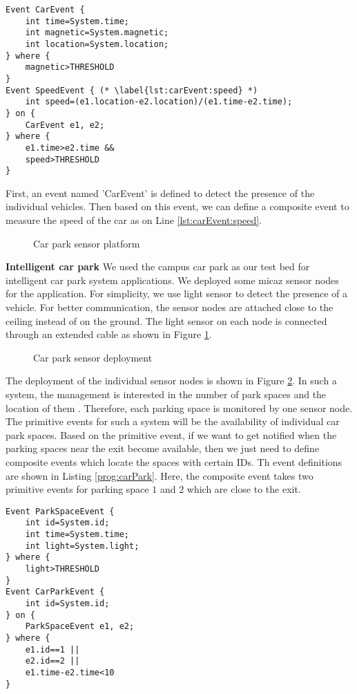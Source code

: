 \begin{lstlisting}[caption=Event definition for tracking vehicles, label=lst:carEvent]
Event CarEvent {
	int time=System.time;
	int magnetic=System.magnetic;
	int location=System.location;
} where {
	magnetic>THRESHOLD
}
Event SpeedEvent { (* \label{lst:carEvent:speed} *)
	int speed=(e1.location-e2.location)/(e1.time-e2.time);
} on {
	CarEvent e1, e2;
} where {
	e1.time>e2.time &&
	speed>THRESHOLD
}
\end{lstlisting}

First, an event named 'CarEvent' is defined to detect the presence of the individual vehicles. Then based on this event, we can define a composite event to measure the speed of the car as on Line \ref{lst:carEvent:speed}.

\begin{figure}
\centering
{}
\caption{Car park sensor platform}
\label{fig:carParkSensor}
\end{figure}

\textbf{Intelligent car park} We used the campus car park as our test bed for intelligent car park system applications. We deployed some micaz sensor nodes for the application. For simplicity, we use light sensor to detect the presence of a vehicle. For better communication, the sensor nodes are attached close to the ceiling instead of on the ground. The light sensor on each node is connected through an extended cable as shown in Figure \ref{fig:carParkSensor}. 

\begin{figure}
\centering
{}
\caption{Car park sensor deployment}
\label{fig:carParkDeployment}
\end{figure}

The deployment of the individual sensor nodes is shown in Figure \ref{fig:carParkDeployment}. In such a system, the management is interested in the number of park spaces and the location of them \cite{tang:carpark}. Therefore, each parking space is monitored by one sensor node.
The primitive events for such a system will be the availability of individual car park spaces. Based on the primitive event, if we want to get notified when the parking spaces near the exit become available, then we just need to define composite events which locate the spaces with certain IDs. Th event definitions are shown in Listing \ref{prog:carPark}. Here, the composite event takes two primitive events for parking space \(1\) and \(2\) which are close to the exit.

\begin{lstlisting}[caption=Event definition for a car park, label=prog:carPark]
Event ParkSpaceEvent {
	int id=System.id;
	int time=System.time;
	int light=System.light;
} where {
	light>THRESHOLD
}
Event CarParkEvent {
	int id=System.id;
} on {
	ParkSpaceEvent e1, e2;
} where {
	e1.id==1 ||
	e2.id==2 ||
	e1.time-e2.time<10
}\end{lstlisting}